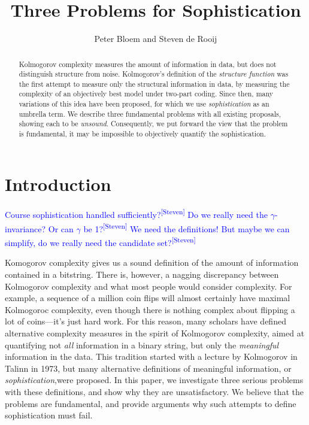 \documentclass{style/llncs}
\title{Three Problems for Sophistication}
\author{Peter Bloem and Steven de Rooij}
\institute{
  System and Network Engineering Group, \\University of Amsterdam, the Netherlands\\
  \email{uva@peterbloem.nl, steven.de.rooij@gmail.com}
}
\newcommand{\sdr}[1]{\textcolor{blue}{\small #1\textsuperscript{[Steven]} }}
\begin{document}
\maketitle

\begin{abstract}
Kolmogorov complexity measures the amount of information in data, but does not distinguish structure from noise. Kolmogorov's definition of the \emph{structure function} was the first attempt to measure only the structural information in data, by measuring the complexity of an objectively best model under two-part coding. Since then, many variations of this idea have been proposed, for which we use \emph{sophistication} as an umbrella term. We describe three fundamental problems with all existing proposals, showing each  to be \emph{unsound}. Consequently, we put forward the view that the problem is fundamental, it may be impossible to objectively quantify the sophistication.
\end{abstract}
\section{Introduction}

\sdr{Course sophistication handled sufficiently?}
\sdr{Do we really need the $\gamma$-invariance? Or can $\gamma$ be 1?}
\sdr{We need the definitions! But maybe we can simplify, do we really need the candidate set?}

Komogorov complexity gives us a sound definition of the amount of information contained in a bitstring. There is, however, a nagging discrepancy between Kolmogorov complexity and what most people would consider complexity. For example, a sequence of a million coin flips will almost certainly have maximal Kolmogoroc complexity, even though there is nothing complex about flipping a lot of coins---it's just hard work. For this reason, many scholars have defined alternative complexity measures in the spirit of Kolmogorov complexity, aimed at quantifying not \emph{all} information in a binary string, but only the \emph{meaningful} information in the data. This tradition started with a lecture by Kolmogorov in Talinn in 1973, but many alternative definitions of meaningful information, or \emph{sophistication},\footnotemark were proposed. In this paper, we investigate three serious problems with these definitions, and show why they are unsatisfactory. We believe that the problems are fundamental, and provide arguments why such attempts to define sophistication must fail.
\end{document}

